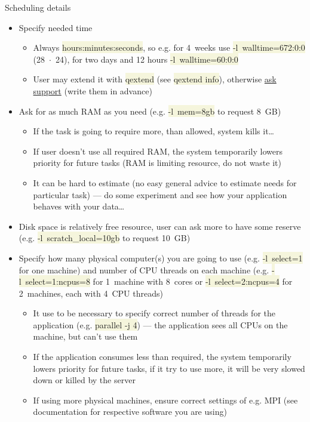 \documentclass[compress, ucs, xelatex, 11pt, xcolor=svgnames, aspectratio=169,
	hyperref={
		bookmarks=true,
		unicode=true,
		colorlinks=true,
		pdftitle={Linux, command line and MetaCentrum},
		plainpages=false,
		pdfauthor={Vojtech Zeisek},
		pdfsubject={Course about use of Linux command line, writing shell scripts and using MetaCentrum of CESNET},
		pdfcreator={XeLaTeX},
		pdfkeywords={Linux, GNU, BASH, shell, command line, MetaCentrum},
		linkcolor=DarkRed, %
		anchorcolor=DarkBlue, %
		citecolor=Indigo, %
		filecolor=NavyBlue, %
		menucolor=DarkMagenta, %
		urlcolor=DarkBlue, %
		pdftex},
	url={hyphens, lowtilde} %
	]{beamer}
\renewcommand{\texttt}[1]{\colorbox{Beige}{{\ttfamily #1}}}
\begin{document}
\begin{frame}[allowframebreaks]{Scheduling details}
	\begin{itemize}
		\item Specify needed time
		\begin{itemize}
			\item Always \texttt{hours:minutes:seconds}, so e.g. for 4~weeks use \texttt{-l~walltime=672:0:0} (28~$\cdot$~24), for two days and 12 hours \texttt{-l~walltime=60:0:0}
			\item User may extend it with \texttt{qextend} (see \texttt{qextend info}), otherwise \href{mailto:meta@cesnet.cz}{ask support} (write them in advance)
		\end{itemize}
		\item Ask for as much RAM as you need (e.g. \texttt{-l~mem=8gb} to request 8~GB)
		\begin{itemize}
			\item If the task is going to require more, than allowed, system kills it\ldots
			\item If user doesn't use all required RAM, the system temporarily lowers priority for future tasks (RAM is limiting resource, do not waste it)
			\item It can be hard to estimate (no easy general advice to estimate needs for particular task) --- do some experiment and see how your application behaves with your data\ldots
		\end{itemize}
		\item Disk space is relatively free resource, user can ask more to have some reserve (e.g. \texttt{-l~scratch\_local=10gb} to request 10~GB)
		\item Specify how many physical computer(s) you are going to use (e.g. \texttt{-l~select=1} for one machine) and number of CPU threads on each machine (e.g. \texttt{-l~select=1:ncpus=8} for 1~machine with 8~cores or \texttt{-l~select=2:ncpus=4} for 2~machines, each with 4~CPU threads)
		\begin{itemize}
			\item It use to be necessary to specify correct number of threads for the application (e.g. \texttt{parallel -j 4}) --- the application sees all CPUs on the machine, but can't use them
			\item If the application consumes less than required, the system temporarily lowers priority for future tasks, if it try to use more, it will be very slowed down or killed by the server
			\item If using more physical machines, ensure correct settings of e.g. MPI (see documentation for respective software you are using)

\end{itemize}
\end{itemize}
\end{frame}
\end{document}
